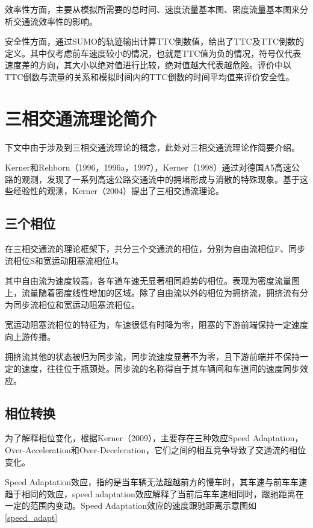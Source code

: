 效率性方面，主要从模拟所需要的总时间、速度流量基本图、密度流量基本图来分析交通流效率性的影响。



安全性方面，通过SUMO的轨迹输出计算TTC倒数值，给出了TTC及TTC倒数的定义。其中仅考虑前车速度较小的情况，也就是TTC值为负的情况，符号仅代表速度差的方向，其大小以绝对值进行比较，绝对值越大代表越危险。评价中以TTC倒数与流量的关系和模拟时间内的TTC倒数的时间平均值来评价安全性。


\section{三相交通流理论简介}
下文中由于涉及到三相交通流理论的概念，此处对三相交通流理论作简要介绍。

Kerner和Rehborn（1996，1996a，1997）\cite{Kerner1996,Kerner1996a,Kerner1997}，Kerner（1998）\cite{Kerner1998}通过对德国A5高速公路的观测，发现了一系列高速公路交通流中的拥堵形成与消散的特殊现象。基于这些经验性的观测，Kerner（2004）\cite{Kerner2004}提出了三相交通流理论。

\subsection{三个相位}
在三相交通流的理论框架下，共分三个交通流的相位，分别为自由流相位F、同步流相位S和宽运动阻塞流相位J。

其中自由流为速度较高，各车道车速无显著相同趋势的相位。表现为密度流量图上，流量随着密度线性增加的区域。除了自由流以外的相位为拥挤流，拥挤流有分为同步流相位和宽运动阻塞流相位。

宽运动阻塞流相位的特征为，车速很低有时降为零，阻塞的下游前端保持一定速度向上游传播。

拥挤流其他的状态被归为同步流，同步流速度显著不为零，且下游前端并不保持一定的速度，往往位于瓶颈处。同步流的名称得自于其车辆间和车道间的速度同步效应。



\subsection{相位转换}
为了解释相位变化，根据Kerner（2009）\cite{S.Kerner2009}，主要存在三种效应Speed Adaptation，Over-Acceleration和Over-Deceleration，它们之间的相互竞争导致了交通流的相位变化。

Speed Adaptation效应，指的是当车辆无法超越前方的慢车时，其车速与前车车速趋于相同的效应，speed adaptation效应解释了当前后车车速相同时，跟驰距离在一定的范围内变动。Speed Adaptation效应的速度跟驰距离示意图如\autoref{speed_adapt}


